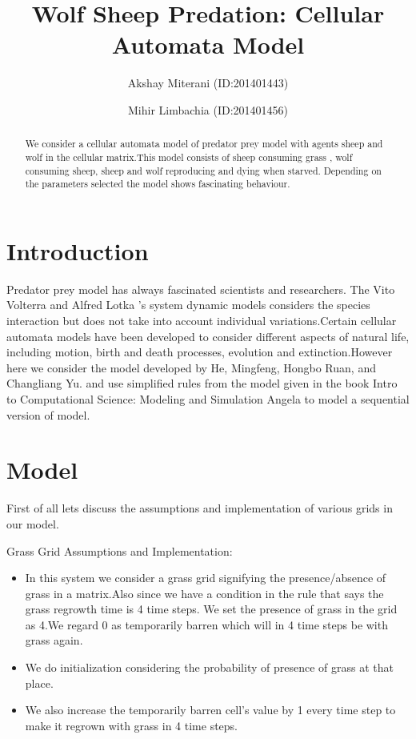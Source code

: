 \documentclass[prl,12pt,citeautoscript,reprint]{revtex4-1}
\begin{document}
\title{Wolf Sheep Predation: Cellular Automata Model }
\author{Akshay Miterani (ID:201401443)}
\author{Mihir Limbachia (ID:201401456)}





\begin{abstract}
We consider a cellular automata model of predator prey model with agents sheep and wolf in the cellular matrix.This model consists of sheep consuming grass , wolf consuming sheep, sheep and wolf reproducing and dying when starved. Depending on the parameters selected the model shows fascinating behaviour.
\end{abstract}
\maketitle
\section{Introduction}
Predator prey model has always fascinated scientists and researchers. The Vito Volterra\cite{Volterra1931} and Alfred Lotka 's\cite{Lotka1920} system dynamic models considers the species interaction but does not take into account individual variations.Certain cellular automata models have been developed to consider different aspects of natural life, including motion, birth and death processes, evolution and extinction.However here we consider the model developed by He, Mingfeng, Hongbo Ruan, and Changliang Yu.\cite{He2003} and use simplified rules from the model given in the book Intro to Computational Science: Modeling and Simulation Angela \cite{Shifet} to model a sequential version of model.  
\section{Model}

First of all lets discuss the assumptions and implementation of various grids in our model.

Grass Grid Assumptions and Implementation:

\begin{itemize}
\item In this system we consider a grass grid signifying the presence/absence of grass in a matrix.Also since we have a condition in the rule that says the grass regrowth time is 4 time steps. We set the presence of grass in the grid as 4.We regard 0 as temporarily barren which will in 4 time steps be with grass again. 
\item We do initialization considering the probability of presence of grass at that place.
\item We also increase the temporarily barren cell's value by 1 every time step to make it regrown with grass in 4 time steps. 
\end{itemize}
\end{document}
